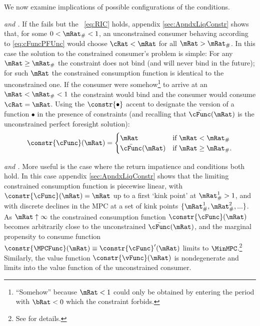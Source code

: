 \documentclass[BufferStockTheory]{subfiles}
\begin{document}
We now examine implications of possible configurations of the conditions.

\textit{\cncl{\GICRaw} and {\RIC}.}  If the {\GICRaw} fails but the \RIC~\eqref{eq:RIC} holds, appendix \ref{sec:ApndxLiqConstr} shows that, for some $0 < \mRat_{\#} < 1$, an unconstrained consumer behaving according to
\eqref{eq:cFuncPFUnc} would choose $\cRat < \mRat$ for all $\mRat >
\mRat_{\#}$.  In this case the solution to the constrained consumer's problem is simple: For any $\mRat
\geq \mRat_{\#}$ the constraint does not bind (and will never bind in
the future); for such $\mRat$ the constrained consumption function is identical
to the unconstrained one.  If the consumer were somehow\footnote{``Somehow'' because $\mRat<1$ could only be obtained by entering the period with $\bRat < 0$ which the constraint forbids.}
to arrive at an $\mRat < \mRat_{\#} < 1$ the constraint would bind and
the consumer would consume $\cRat=\mRat$.  Using the $\constr{\bullet}$ accent to designate the version of a function $\bullet$ in the presence of constraints (and recalling that $\bar{\cFunc}(\mRat)$ is the unconstrained perfect foresight solution):
\begin{equation}
  \constr{\cFunc}(\mRat)=
  \begin{cases}
    \mRat & \text{if $\mRat < \mRat_{\#}$} \\
    \bar{\cFunc}(\mRat)  & \text{if $\mRat \geq \mRat_{\#}$.}
  \end{cases}
\end{equation}

\textit{{\GICRaw} and {\RIC}.}  More useful is the case where the return impatience and {\GIC} conditions both hold.  In this case appendix \ref{sec:ApndxLiqConstr} shows that the limiting constrained consumption function is piecewise linear, with $\constr{\cFunc}(\mRat)=\mRat$ up to a first `kink point' at $\mRat_{\#}^{1}>1$, and with discrete declines in the MPC at a set of kink points $\{\mRat_{\#}^{1},\mRat_{\#}^{2},...\}$.  As $\mRat \uparrow \infty$ the constrained consumption function $\constr{\cFunc}(\mRat)$ becomes arbitrarily close to the unconstrained $\bar{\cFunc}(\mRat)$, and the marginal propensity to consume function $\constr{\MPCFunc}(\mRat) \equiv \constr{\cFunc}^{\prime}(\mRat)$ limits to $\MinMPC$.\footnote{See \cite{chkLiqConstr} for details.}  Similarly, the value function $\constr{\vFunc}(\mRat)$ is nondegenerate and limits into the value function of the unconstrained consumer.
\end{document}
